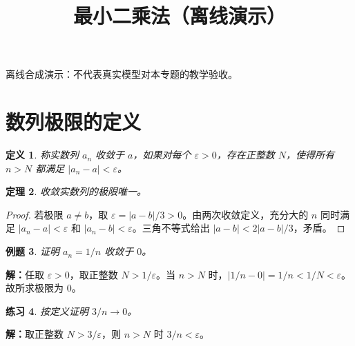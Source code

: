 \documentclass[UTF8,fontset=fandol,11pt]{ctexart}
\title{最小二乘法（离线演示）}
\date{}
\newtheorem{definition}{定义}[section]
\newtheorem{theorem}[definition]{定理}
\newtheorem{example}[definition]{例题}
\newtheorem{exercise}[definition]{练习}
\begin{document}
\maketitle
\par\noindent 离线合成演示：不代表真实模型对本专题的教学验收。\par
\section{数列极限的定义}\label{sec:S01}
\begin{definition}
称实数列 $a_n$ 收敛于 $a$，如果对每个 $\varepsilon>0$，存在正整数 $N$，使得所有 $n>N$ 都满足 $|a_n-a|<\varepsilon$。
\end{definition}
\begin{theorem}
收敛实数列的极限唯一。
\end{theorem}
\begin{proof}
若极限 $a\ne b$，取 $\varepsilon=|a-b|/3>0$。由两次收敛定义，充分大的 $n$ 同时满足 $|a_n-a|<\varepsilon$ 和 $|a_n-b|<\varepsilon$。三角不等式给出 $|a-b|<2|a-b|/3$，矛盾。
\end{proof}
\begin{example}
证明 $a_n=1/n$ 收敛于 $0$。
\end{example}
\par\noindent\textbf{解：}任取 $\varepsilon>0$，取正整数 $N>1/\varepsilon$。当 $n>N$ 时，$|1/n-0|=1/n<1/N<\varepsilon$。故所求极限为 $0$。\par
\begin{exercise}
\label{mathagent:exercise:0cc0e7ee849eb730aacd59475ce492febad40593b04fd779ce32c70f94e1140f}
按定义证明 $3/n\to0$。
\end{exercise}
\par\noindent\textbf{解：}取正整数 $N>3/\varepsilon$，则 $n>N$ 时 $3/n<\varepsilon$。\par
\end{document}
